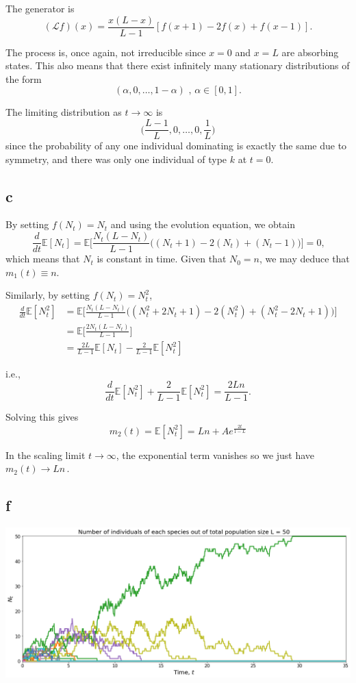 \documentclass[12pt, twoside, a4paper]{article}
\newcommand{\Gen}{\mathcal{L}}
\begin{document}
The generator is 
\[
(\Gen f) (x) = \frac{x(L-x)}{L-1} [f(x+1) - 2f(x) + f(x-1)] \text{.}
\]

The process is, once again, not irreducible since $x = 0$ and $x = L$ are absorbing states. This also means that there exist infinitely many stationary distributions of the form 
\[
(\alpha, 0, \dots, 1- \alpha) \text{ , } \alpha \in [0, 1] \text{.}
\]

The limiting distribution as $t \to \infty$ is 
\[
\bigg( \frac{L-1}{L}, 0, \dots, 0, \frac{1}{L} \bigg)
\]
since the probability of any one individual dominating is exactly the same due to symmetry, and there was only one individual of type $k$ at $t = 0$. 

\subsection*{c}
By setting $f(N_t) = N_t$ and using the evolution equation, we obtain 
\[
\frac{d}{dt} \mathbb{E} [N_t] = \mathbb{E} \bigg[ \frac{N_t (L-N_t)}{L-1} \bigg( (N_t+1) - 2(N_t) + (N_t-1) \bigg) \bigg] = 0 \text{,}
\]
which means that $N_t$ is constant in time. Given that $N_0 = n$, we may deduce that $m_1(t) \equiv n$. 

Similarly, by setting $f(N_t) = N_t^2$, 
\begin{align*}
\frac{d}{dt} \mathbb{E} [N_t^2] 
&= \mathbb{E} \bigg[ \frac{N_t (L-N_t)}{L-1} \bigg( (N_t^2 + 2 N_t +1) - 2(N_t^2) + (N_t^2 - 2 N_t +1) \bigg) \bigg] \\
&= \mathbb{E} \bigg[ \frac{2 N_t (L - N_t)}{L-1} \bigg]\\
&= \frac{2L}{L-1} \mathbb{E} [N_t] - \frac{2}{L-1} \mathbb{E} [N_t^2]
\end{align*}

i.e., 
\[
\frac{d}{dt} \mathbb{E} [N_t^2] + \frac{2}{L-1} \mathbb{E} [N_t^2] = \frac{2Ln}{L-1} \text{.}
\]

Solving this gives
\[
m_2(t) = \mathbb{E} [N_t^2] = Ln + Ae^{\frac{2t}{1-L}}
\]

In the scaling limit $t \to \infty$, the exponential term vanishes so we just have $m_2(t) \to Ln \,$. 

\subsection*{f}
\includegraphics[width = 170mm]{moran}
\end{document}
